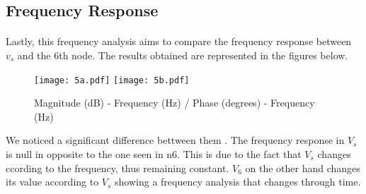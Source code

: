 \subsection{Frequency Response}
\paragraph{}

\par Lastly, this frequency analysis aims to compare the frequency response between $v_s$ and the 6th node. The results obtained are represented in the figures below.

\begin{figure}[H]
    \texttt{[image: 5a.pdf]}
    \hfill\texttt{[image: 5b.pdf]}
    \centering
    \caption{Magnitude (dB) - Frequency (Hz) / Phase (degrees) - Frequency (Hz)}
    \label{mag}
\end{figure}

\par We noticed a significant difference bettween them . The frequency response in $V_s$ is null in opposite to the one seen in n6. This is due to the fact that $V_s$ changes ccording to the frequency, thus remaining constant. $V_6$ on the other hand changes its value according to $V_s$ showing a frequency analysis that changes through time.





